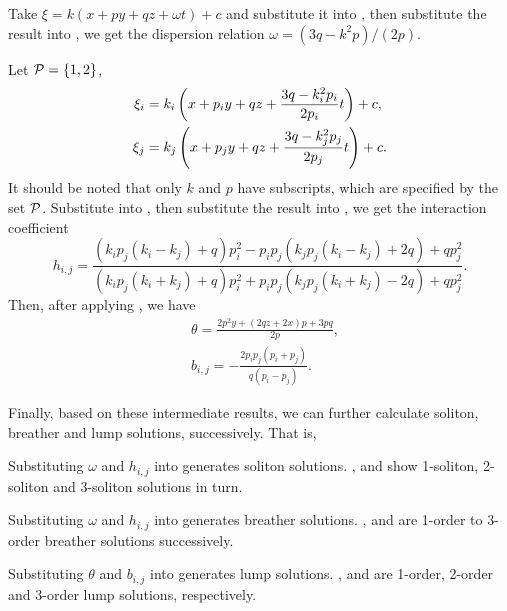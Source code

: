 Take $\xi=k(x+py+qz+\omega t)+c$ and substitute it into , then substitute the result into , we get the dispersion relation $\omega=(3q-k^2p)/(2p)$.

Let $\mathcal{P}=\left\{1,2\right\}$,
\begin{equation}
\begin{split}
\xi_i&=k_i\left(x+p_iy+qz+\frac{3q-k_i^2p_i}{2p_i}t\right)+c, \\ 
\xi_j&=k_j\left(x+p_jy+qz+\frac{3q-k_j^2p_j}{2p_j}t\right)+c.
\end{split} \label{JMEQ-xij}
\end{equation}
It should be noted that only $k$ and $p$ have subscripts, which are specified by the set $\mathcal{P}$. Substitute  into , then substitute the result into , we get the interaction coefficient
\begin{equation}
    h_{i,j}=\frac{(k_ip_j(k_i-k_j)+q)p_i^2-p_ip_j(k_jp_j(k_i-k_j)+2q)+qp_j^2}{(k_ip_j(k_i+k_j)+q)p_i^2+p_ip_j(k_jp_j(k_i+k_j)-2q)+qp_j^2}.
\end{equation}
Then, after applying , we have
\begin{equation}
\begin{split}
&\theta=\frac{2p^2y+(2qz+2x)p+3pq}{2p}, \\ 
&b_{i,j}=-\frac{2p_ip_j(p_i+p_j)}{q(p_i-p_j)}.
\end{split}
\end{equation}

Finally, based on these intermediate results, we can further calculate soliton, breather and lump solutions, successively. That is,
\begin{compactitem}[\textbullet]
\item Substituting $\omega$ and $h_{i,j}$ into  generates soliton solutions. ,  and  show 1-soliton, 2-soliton and 3-soliton solutions in turn. 
\item Substituting $\omega$ and $h_{i,j}$ into  generates breather solutions. ,  and  are 1-order to 3-order breather solutions successively.
\item Substituting $\theta$ and $b_{i,j}$ into  generates lump solutions. ,  and  are 1-order, 2-order and 3-order lump solutions, respectively. 
\end{compactitem}

